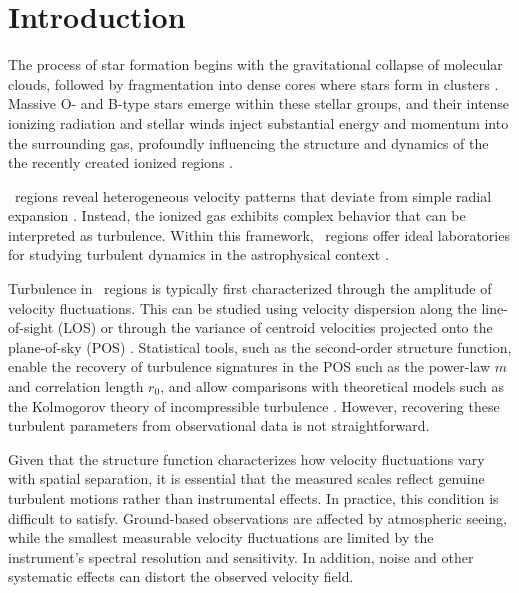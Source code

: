 \documentclass[fleqn,usenatbib, useAMS, a4paper]{mnras}
\newcommand\hii{\ion{H}{II}}
\begin{document}
\section{Introduction}

The process of star formation begins with the gravitational collapse of molecular clouds, followed by fragmentation into dense cores where stars form in clusters \citep{2003RPPh...66.1651L, 2007ARA&A..45..565M}. 
Massive O- and B-type stars emerge within these stellar groups, and their intense ionizing radiation and stellar winds inject substantial energy and momentum into the surrounding gas, profoundly influencing the structure and dynamics of the the recently created ionized regions \citep{2006ApJ...647..397M, 2024RMxAC..58....8A}.

\hii\ regions reveal heterogeneous velocity patterns that deviate from simple radial expansion \citep{TT1979,1996AJ....111.2349H,2015A&A...573A..10M,2019MNRAS.487.2200Z}.
Instead, the ionized gas exhibits complex behavior that can be interpreted as turbulence. 
Within this framework, \hii\ regions offer ideal laboratories for studying turbulent dynamics in the astrophysical context \citep{1949ApJ...110..329C}.

Turbulence in \hii\ regions is typically first characterized through the amplitude of velocity fluctuations. 
This can be studied using velocity dispersion along the line-of-sight (LOS) or through the variance of centroid velocities projected onto the plane-of-sky (POS) \citep{1988A&A...201..199A,arthur2016turbulence}. 
Statistical tools, such as the second-order structure function, enable the recovery of turbulence signatures in the POS such as the power-law $m$ and correlation length \(r_0\), and allow comparisons with theoretical models such as the Kolmogorov theory of incompressible turbulence \citep{von1951methode,1955IAUS....2..131C,munch1958internal,1961MNRAS.122....1F,1970A&A.....8..486L,Roy:1985a,1986ApJ...300..624R,1987ApJ...317..686O, castaneda1988,Mivi1995,1997ApJ...487..163M,Chakraborty:1999a, lagrois2011,arthur2016turbulence,2019arXiv191203543M,garciav23,2025ApJ...986..159R,2026A&A...707A.339R}.
However, recovering these turbulent parameters from observational data is not straightforward.

Given that the structure function characterizes how velocity fluctuations vary with spatial separation, it is essential that the measured scales reflect genuine turbulent motions rather than instrumental effects.
In practice, this condition is difficult to satisfy. 
Ground-based observations are affected by atmospheric seeing, while the smallest measurable velocity fluctuations are limited by the instrument’s spectral resolution and sensitivity. 
In addition, noise and other systematic effects can distort the observed velocity field. 
\end{document}

